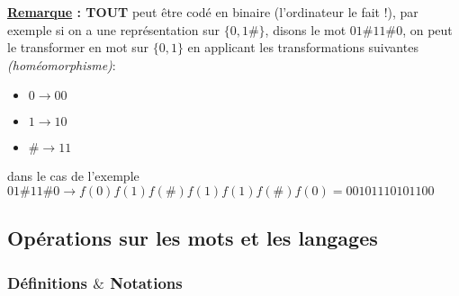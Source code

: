 \documentclass{article}
\newcommand{\titre}[1]{\textcolor{title}{#1}}
\newcommand{\tssect}[1]{\titre{\subsection{#1}}}
\newcommand{\tsssect}[1]{\titre{\subsubsection{#1}}}
\newcommand{\term}[1]{\textit{\textcolor{maintitle}{#1}}}
\begin{document}
\begin{sffamily}
\noindent \textbf{\underline{Remarque} : TOUT} peut être codé en binaire (l'ordinateur le fait !), par exemple si on a 
une représentation sur $\{0,1\#\}$, disons le mot $01\#11\#0$, on peut le transformer en mot sur $\{0,1\}$ en applicant 
les transformations suivantes \term{(homéomorphisme)}:
\begin{itemize}
\item $0\to 00$
\item $1\to 10$
\item $\#\to 11$
\end{itemize}
dans le cas de l'exemple $01\#11\#0 \rightarrow f(0)f(1)f(\#)f(1)f(1)f(\#)f(0) = 00101110101100$

\tssect{Opérations sur les mots et les langages}

\tsssect{Définitions $\&$ Notations}


\end{sffamily}
\end{document}
